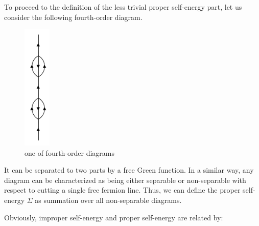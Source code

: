 To proceed to the definition of the less trivial proper self-energy part, let us consider the following fourth-order diagram.
\begin{figure}
	\centering
	\includegraphics[height=6cm]{./figures/order4.png}
	\caption{one of fourth-order diagrams}
\end{figure}

It can be separated to two parts by a free Green function.
In a similar way, any diagram can be characterized as being either separable or non-separable with respect to cutting a single free fermion line. 
Thus, we can define the proper self-energy $\Sigma$ as summation over all non-separable diagrams.

Obviously, improper self-energy and proper self-energy are related by:

